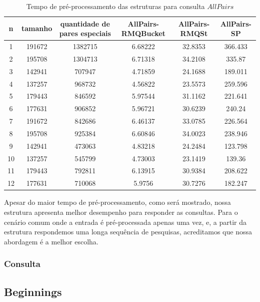 \documentclass[dissertacao, brazil]{ThesisPUC}
\begin{document}
\begin{table}
\small
\begin{center}
\begin{tabular}{|c|c|c|c|c|c|}
\hline
\textbf{n} & \textbf{tamanho} & \textbf{quantidade de pares especiais} & \textbf{AllPairs-RMQBucket} & \textbf{AllPairs-RMQSt} & \textbf{AllPairs-SP}\\
\hline
1 & 191672 & 1382715 & 6.68222 & 32.8353 & 366.433\\
\hline
2 & 195708 & 1304713 & 6.71318 & 34.2108 & 335.87\\
\hline
3 & 142941 & 707947 & 4.71859 & 24.1688 & 189.011\\
\hline
4 & 137257 & 968732 &  4.56822 &  23.5573 & 259.596\\
\hline
5 & 179443 & 846592 &  5.97544 & 31.1162 & 221.641\\
\hline
6 & 177631 & 906852 & 5.96721 & 30.6239 & 240.24\\
\hline
7 &  191672 & 842686 &  6.46137 & 33.0785 & 226.564\\
\hline
8 & 195708 &  925384 &  6.60846 &  34.0023 & 238.946\\
\hline
9 & 142941 & 473063 &  4.83218 & 24.2484 &  123.798\\
\hline
10 &  137257 &  545799 &  4.73003 & 23.1419 & 139.36\\
\hline
11 &  179443 &  792811 &  6.13915 &  30.9384 &  208.622\\
\hline
12 &  177631 & 710068 & 5.9756 & 30.7276 & 182.247\\
\hline
\end{tabular}

\end{center}
\label{tab:all_pre_series}
\caption{Tempo de pré-processamento das estruturas para consulta $AllPairs$}
\normalsize
\end{table}


Apesar do maior tempo de pré-processamento, como será mostrado, nossa estrutura apresenta
melhor desempenho para responder as consultas. Para o cenário comum onde a entrada
é pré-processada apenas uma vez, e, a partir da estrutura respondemos uma longa
sequência de pesquisas, acreditamos que nossa abordagem é a melhor escolha.


\subsubsection{Consulta}

\subsection{Beginnings}
\end{document}
